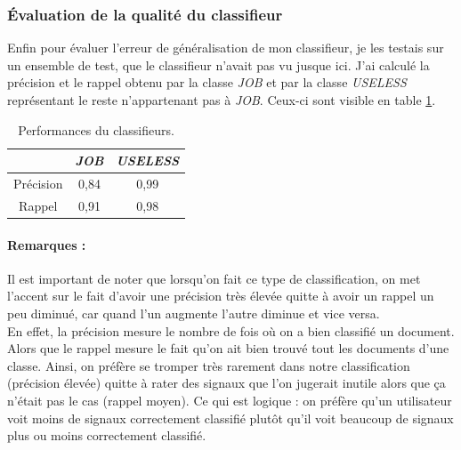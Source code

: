             \subsubsection{Évaluation de la qualité du classifieur}
                Enfin pour évaluer l'erreur de généralisation de mon classifieur, je les testais sur un ensemble de test, que le classifieur n'avait pas \og vu \fg jusque ici. J'ai calculé la précision et le rappel obtenu par la classe \textit{JOB} et par la classe \textit{USELESS} représentant le reste n'appartenant pas à \textit{JOB}. Ceux-ci sont visible en table \ref{tab:classif_perf}.
                \begin{table}[h]
                    \centering
                    \begin{tabular}{| c | c | c |}
                        \hline
                         & \textit{JOB} & \textit{USELESS} \\
                        \hline
                        Précision & 0,84 & 0,99 \\
                        Rappel & 0,91 & 0,98 \\
                        \hline
                    \end{tabular}
                    \caption{Performances du classifieurs.}
                    \label{tab:classif_perf}
                \end{table}

            \paragraph{Remarques :}
                Il est important de noter que lorsqu'on fait ce type de classification, on met l'accent sur le fait d'avoir une précision très élevée quitte à avoir un rappel un peu diminué, car quand l'un augmente l'autre diminue et vice versa.\\

                En effet, la précision mesure le nombre de fois où on a bien classifié un document. Alors que le rappel mesure le fait qu'on ait bien trouvé tout les documents d'une classe. Ainsi, on préfère se tromper très rarement dans notre classification (précision élevée) quitte à rater des signaux que l'on jugerait inutile alors que ça n'était pas le cas (rappel moyen). Ce qui est logique : on préfère qu'un utilisateur voit moins de signaux correctement classifié plutôt qu'il voit beaucoup de signaux plus ou moins correctement classifié.

